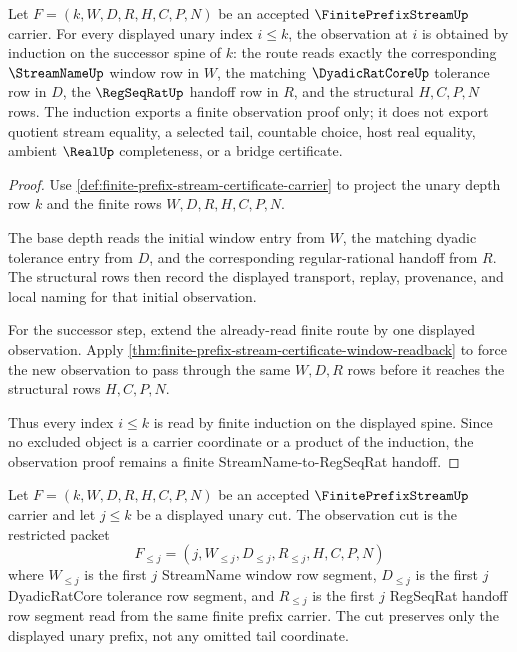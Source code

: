 \begin{theorem}
\label{thm:finite-prefix-stream-certificate-observation-induction}
Let $F=(k,W,D,R,H,C,P,N)$ be an accepted $\FinitePrefixStreamUp$ carrier. For every displayed unary index $i \leq k$, the observation at $i$ is obtained by induction on the successor spine of $k$: the route reads exactly the corresponding $\StreamNameUp$ window row in $W$, the matching $\DyadicRatCoreUp$ tolerance row in $D$, the $\RegSeqRatUp$ handoff row in $R$, and the structural $H,C,P,N$ rows. The induction exports a finite observation proof only; it does not export quotient stream equality, a selected tail, countable choice, host real equality, ambient $\RealUp$ completeness, or a bridge certificate.
\end{theorem}
\begin{proof}
Use \autoref{def:finite-prefix-stream-certificate-carrier} to project the unary depth row $k$ and the finite rows $W,D,R,H,C,P,N$.

The base depth reads the initial window entry from $W$, the matching dyadic tolerance entry from $D$, and the corresponding regular-rational handoff from $R$. The structural rows then record the displayed transport, replay, provenance, and local naming for that initial observation.

For the successor step, extend the already-read finite route by one displayed observation. Apply \autoref{thm:finite-prefix-stream-certificate-window-readback} to force the new observation to pass through the same $W,D,R$ rows before it reaches the structural rows $H,C,P,N$.

Thus every index $i \leq k$ is read by finite induction on the displayed spine. Since no excluded object is a carrier coordinate or a product of the induction, the observation proof remains a finite StreamName-to-RegSeqRat handoff.
\end{proof}

\begin{definition}
\label{def:finite-prefix-stream-certificate-observation-cut}
Let $F=(k,W,D,R,H,C,P,N)$ be an accepted $\FinitePrefixStreamUp$ carrier and let $j \leq k$ be a displayed unary cut. The observation cut is the restricted packet
$$
F_{\leq j}=(j,W_{\leq j},D_{\leq j},R_{\leq j},H,C,P,N)
$$
where $W_{\leq j}$ is the first $j$ StreamName window row segment, $D_{\leq j}$ is the first $j$ DyadicRatCore tolerance row segment, and $R_{\leq j}$ is the first $j$ RegSeqRat handoff row segment read from the same finite prefix carrier. The cut preserves only the displayed unary prefix, not any omitted tail coordinate.
\end{definition}

